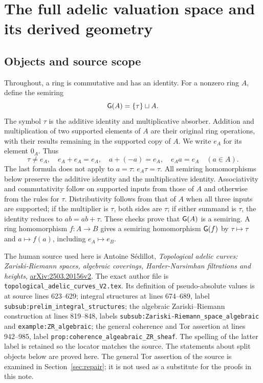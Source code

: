 \section{The full adelic valuation space and its derived geometry}


\subsection{Objects and source scope}

Throughout, a ring is commutative and has an identity. For a nonzero ring
$A$, define the semiring
\[
 \mathsf G(A)=\{\tau\}\sqcup A.
\]
The symbol $\tau$ is the additive identity and multiplicative absorber.
Addition and multiplication of two supported elements of $A$ are their
original ring operations, with their results remaining in the supported
copy of $A$. We write $e_A$ for its element $0_A$. Thus
\[
 \tau\ne e_A,\quad e_A+e_A=e_A,\quad
 a+(-a)=e_A,\quad e_Aa=e_A\quad(a\in A).
 \tag{AV1.1}\label{eq:split-identities}
\]
The last formula does not apply to $a=\tau$: $e_A\tau=\tau$.
All semiring homomorphisms below preserve the additive identity and the
multiplicative identity. Associativity and commutativity follow on supported
inputs from those of $A$ and otherwise from the rules for $\tau$.
Distributivity follows from that of $A$ when all three inputs are supported;
if the multiplier is $\tau$, both sides are $\tau$; if either summand is
$\tau$, the identity reduces to $a b=a b+\tau$. These checks prove that
$\mathsf G(A)$ is a semiring. A ring homomorphism $f:A\to B$ gives a semiring
homomorphism $\mathsf G(f)$ by $\tau\mapsto\tau$ and $a\mapsto f(a)$, including
$e_A\mapsto e_B$.

The human source used here is Antoine S\'edillot,
\emph{Topological adelic curves: Zariski-Riemann spaces, algebraic coverings,
Harder-Narsimhan filtrations and heights},
\href{https://arxiv.org/abs/2503.20156v2}{arXiv:2503.20156v2}.
The exact author file is \nolinkurl{topological_adelic_curves_V2.tex}.
Its definition of pseudo-absolute values is at source lines 623--629;
integral structures at lines 674--689, label
\nolinkurl{subsub:prelim_integral_structures}; the algebraic
Zariski--Riemann construction at lines 819--848, labels
\nolinkurl{subsub:Zariski-Riemann_space_algebraic} and
\nolinkurl{example:ZR_algebraic}; the general coherence and Tor assertion
at lines 942--985, label
\nolinkurl{prop:coherence_algeabraic_ZR_sheaf}.
The spelling of the latter label is retained so the locator matches the
source. The statements about split objects below are proved here. The
general Tor assertion of the source is examined in Section~\ref{sec:repair};
it is not used as a substitute for the proofs in this note.

